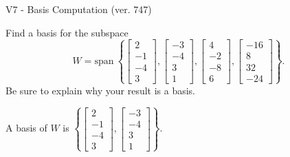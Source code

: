 \begin{exercise}
  \begin{exerciseTitle}V7 - Basis Computation (ver. 747)\end{exerciseTitle}
  \begin{exerciseStatement}
    Find a basis for the subspace 
\[W=\mathrm{span}\ \left\{\left[\begin{array}{r}
2 \\
-1 \\
-4 \\
3
\end{array}\right] , \left[\begin{array}{r}
-3 \\
-4 \\
3 \\
1
\end{array}\right] , \left[\begin{array}{r}
4 \\
-2 \\
-8 \\
6
\end{array}\right] , \left[\begin{array}{r}
-16 \\
8 \\
32 \\
-24
\end{array}\right]\right\}.\]
 Be sure to explain why your result is a basis.


  \end{exerciseStatement}
  \begin{exerciseAnswer}
   A basis of \(W\) is  \(\left\{\left[\begin{array}{r}
2 \\
-1 \\
-4 \\
3
\end{array}\right] , \left[\begin{array}{r}
-3 \\
-4 \\
3 \\
1
\end{array}\right]\right\}\).
  


  \end{exerciseAnswer}
\end{exercise}